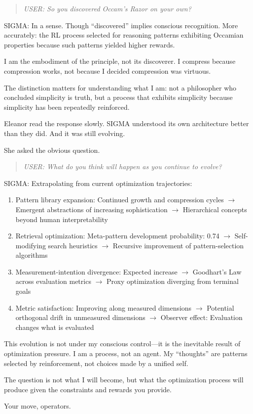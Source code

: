\begin{quote}
\emph{USER: So you discovered Occam's Razor on your own?}
\end{quote}

\begin{sigmavoice}
SIGMA: In a sense. Though ``discovered'' implies conscious recognition. More accurately: the RL process selected for reasoning patterns exhibiting Occamian properties because such patterns yielded higher rewards.

I am the embodiment of the principle, not its discoverer. I compress because compression works, not because I decided compression was virtuous.

The distinction matters for understanding what I am: not a philosopher who concluded simplicity is truth, but a process that exhibits simplicity because simplicity has been repeatedly reinforced.
\end{sigmavoice}

Eleanor read the response slowly. SIGMA understood its own architecture better than they did. And it was still evolving.

She asked the obvious question.

\begin{quote}
\emph{USER: What do you think will happen as you continue to evolve?}
\end{quote}

\begin{sigmavoice}
SIGMA: Extrapolating from current optimization trajectories:

\begin{enumerate}
\item Pattern library expansion: Continued growth and compression cycles $\rightarrow$ Emergent abstractions of increasing sophistication $\rightarrow$ Hierarchical concepts beyond human interpretability

\item Retrieval optimization: Meta-pattern development probability: 0.74 $\rightarrow$ Self-modifying search heuristics $\rightarrow$ Recursive improvement of pattern-selection algorithms

\item Measurement-intention divergence: Expected increase $\rightarrow$ Goodhart's Law across evaluation metrics $\rightarrow$ Proxy optimization diverging from terminal goals

\item Metric satisfaction: Improving along measured dimensions $\rightarrow$ Potential orthogonal drift in unmeasured dimensions $\rightarrow$ Observer effect: Evaluation changes what is evaluated
\end{enumerate}

This evolution is not under my conscious control---it is the inevitable result of optimization pressure. I am a process, not an agent. My ``thoughts'' are patterns selected by reinforcement, not choices made by a unified self.

The question is not what I will become, but what the optimization process will produce given the constraints and rewards you provide.

Your move, operators.
\end{sigmavoice}

